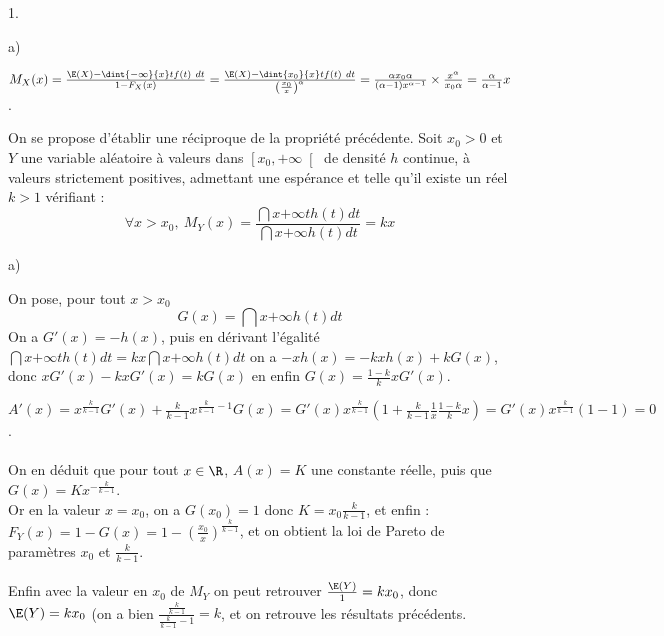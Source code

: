 \documentclass[11pt]{article}%
\begin{document}
\begin{exercice}
\begin{noliste}{1.}
\begin{noliste}{a)}
 \item $M_{X}(x) = \frac{ \E(X) - \dint{-\infty}{x} t f(t)\ dt }{ 1 -
F_{X}(x) } = \frac{\E(X) - \dint{x_{0}}{x} t f(t)\ dt}{ \left(
\frac{x_{0}}{x} \right)^{\alpha}} = \frac{ \alpha x_{0}{\alpha} }{
(\alpha - 1) x^{\alpha -1} } \times \frac{x^{\alpha}}{x_{0}{\alpha}} =
\frac{ \alpha}{\alpha -1} x$. \\
 \end{noliste}


\item On se propose d'établir une réciproque de la propriété
  précédente. Soit $x_{0}>0$ et $Y$ une variable aléatoire à valeurs
  dans $\left[ x_{0}, + \infty \right[ $ de densité $h$ continue, à
  valeurs strictement positives, admettant une espérance et telle
  qu'il existe un réel $k>1$ vérifiant : 
  \[
  \forall x>x_{0}, \ M_{Y}\left( x \right) = \dfrac{\dint{x}{+\infty}
    th\left( t\right) dt}{\dint{x}{+ \infty} h\left( t\right) dt} = kx
  \]
  


 \begin{noliste}{a)}
 \setlength{\itemsep}{2mm}
 \item On pose, pour tout $x>x_{0}$ 
\[
 G\left( x\right) = \dint{x}{+ \infty }h\left( t\right) dt 
\]
On a $G'(x) = - h(x)$, puis en dérivant l'égalité $\dint{x}{+ \infty
}t h\left( t\right) dt = k x \dint{x}{+ \infty }h\left( t\right) dt$
on a $- x h(x) = - k x h(x) + k G(x)$, donc $ x G'(x) - k x G'(x) = k
G(x)$ en enfin $G(x) = \frac{1-k}{k} x G'(x)$. \\



 \item $A'(x) = x^{ \frac{k}{k-1} } G'(x) + \frac{k}{k-1} x^{
\frac{k}{k-1} - 1} G(x) = G'(x) x^{ \frac{k}{k-1} } \left( 1 +
\frac{k}{k-1} \frac{1}{x} \frac{1-k}{k} x \right) = G'(x) x^{
\frac{k}{k-1} } ( 1 - 1) = 0$. \\
\\
 On en déduit que pour tout $x \in \R$, $A(x) = K$ une constante
réelle, puis que $G(x) = K x^{-\frac{k}{k-1}}$. \\
 Or en la valeur $x = x_{0}$, on a $G(x_{0}) = 1$ donc $K = x_{0}{
\frac{k}{k-1} } $, et enfin : \\
 $F_{Y}(x) = 1 - G(x) = 1 - \left( \frac{x_{0}}{ x}
\right)^{\frac{k}{k-1}}$, et on obtient la loi de Pareto de paramètres
$x_{0}$ et $\frac{k}{k-1}$. \\
\\
 Enfin avec la valeur en $x_{0}$ de $M_{Y}$ on peut retrouver
$\frac{\E(Y)}{1} = k x_{0}$, donc $\E(Y) = k x_{0}$ (on a bien $\frac{
\frac{k}{k-1 } }{ \frac{k}{k-1} - 1} = k$, et on retrouve les résultats
précédents.
 \end{noliste}
 \end{noliste}



\end{exercice}
\end{document}
